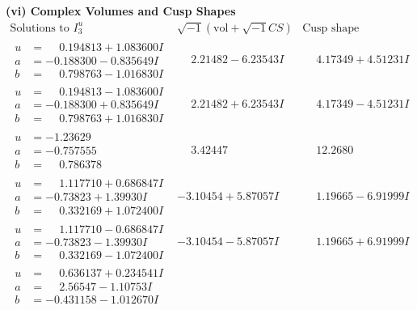 \documentclass[1p]{elsarticle_modified}
\theoremstyle{definition}
\newcommand{\I}{\sqrt{-1}}
\begin{document}
\newpage\flushleft \textbf{(vi) Complex Volumes and Cusp Shapes}
$$\begin{array}{c|c|c}  
\text{Solutions to }I^u_{3}& \I (\text{vol} + \sqrt{-1}CS) & \text{Cusp shape}\\
 \hline 
\begin{aligned}
u &= \phantom{-}0.194813 + 1.083600 I \\
a &= -0.188300 - 0.835649 I \\
b &= \phantom{-}0.798763 - 1.016830 I\end{aligned}
 & \phantom{-}2.21482 - 6.23543 I & \phantom{-}4.17349 + 4.51231 I \\ \hline\begin{aligned}
u &= \phantom{-}0.194813 - 1.083600 I \\
a &= -0.188300 + 0.835649 I \\
b &= \phantom{-}0.798763 + 1.016830 I\end{aligned}
 & \phantom{-}2.21482 + 6.23543 I & \phantom{-}4.17349 - 4.51231 I \\ \hline\begin{aligned}
u &= -1.23629\phantom{ +0.000000I} \\
a &= -0.757555\phantom{ +0.000000I} \\
b &= \phantom{-}0.786378\phantom{ +0.000000I}\end{aligned}
 & \phantom{-}3.42447\phantom{ +0.000000I} & \phantom{-}12.2680\phantom{ +0.000000I} \\ \hline\begin{aligned}
u &= \phantom{-}1.117710 + 0.686847 I \\
a &= -0.73823 + 1.39930 I \\
b &= \phantom{-}0.332169 + 1.072400 I\end{aligned}
 & -3.10454 + 5.87057 I & \phantom{-}1.19665 - 6.91999 I \\ \hline\begin{aligned}
u &= \phantom{-}1.117710 - 0.686847 I \\
a &= -0.73823 - 1.39930 I \\
b &= \phantom{-}0.332169 - 1.072400 I\end{aligned}
 & -3.10454 - 5.87057 I & \phantom{-}1.19665 + 6.91999 I \\ \hline\begin{aligned}
u &= \phantom{-}0.636137 + 0.234541 I \\
a &= \phantom{-}2.56547 - 1.10753 I \\
b &= -0.431158 - 1.012670 I\end{aligned}

\end{array}$$
\end{document}
